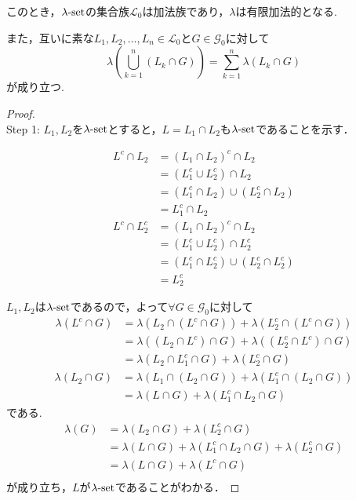 \documentclass{jsarticle}
\begin{document}
このとき，$\lambda{\rm \text{-}set}$の集合族$\mathcal{L}_0$は加法族であり，$\lambda$は有限加法的となる.

また，互いに素な$L_1,L_2,\dots,L_n\in\mathcal{L}_0$と$G\in\mathcal{G}_0$に対して
\begin{equation}
    \lambda\left( \bigcup_{k=1}^n (L_k\cap G) \right) = \sum_{k=1}^n \lambda(L_k\cap G) \nonumber 
\end{equation}
が成り立つ.

\begin{proof} \mbox{}\\
Step 1:
$L_1,L_2$を$\lambda{\rm \text{-}set}$とすると，$L=L_1\cap L_2$も$\lambda{\rm \text{-}set}$であることを示す．
\begin{itembox}{}
    \begin{align}
    L^c\cap L_2 &= (L_1\cap L_2)^c\cap L_2 \nonumber \\
    &=(L_1^c\cup L_2^c)\cap L_2 \nonumber \\
    &=(L_1^c \cap L_2) \cup (L_2^c \cap L_2) \nonumber \\
    &=L_1^c \cap L_2 \nonumber
    \end{align}
    \begin{align}
        L^c\cap L_2^c &= (L_1\cap L_2)^c\cap L_2 \nonumber \\
        &=(L_1^c\cup L_2^c)\cap L_2^c \nonumber \\
        &=(L_1^c \cap L_2^c) \cup (L_2^c \cap L_2^c) \nonumber \\
        &=L_2^c \nonumber
    \end{align}
\end{itembox}

$L_1,L_2$は$\lambda{\rm \text{-}set}$であるので，よって$\forall G\in\mathcal{G}_0$に対して
\begin{align}
    \lambda(L^c\cap G) &= \lambda(L_2\cap (L^c\cap G)) + \lambda(L_2^c\cap (L^c\cap G)) \nonumber \\
    &= \lambda((L_2\cap L^c)\cap G) + \lambda((L_2^c\cap L^c)\cap G) \nonumber \\
    &= \lambda(L_2\cap L_1^c\cap G) + \lambda(L_2^c\cap G) \nonumber
\end{align}
\begin{align}
    \lambda(L_2\cap G) &= \lambda(L_1\cap (L_2\cap G)) + \lambda(L_1^c\cap (L_2\cap G)) \nonumber \\
    &= \lambda(L\cap G) + \lambda(L_1^c\cap L_2\cap G) \nonumber
\end{align}
である.
\begin{align}
    \lambda(G) &= \lambda(L_2\cap G) + \lambda(L_2^c\cap G) \nonumber \\
    &= \lambda(L\cap G) + \lambda(L_1^c\cap L_2\cap G) + \lambda(L_2^c\cap G) \nonumber \\
    &= \lambda(L\cap G) + \lambda(L^c\cap G) \nonumber \\
\end{align}
が成り立ち，$L$が$\lambda{\rm \text{-}set}$であることがわかる．


\end{proof}
\end{document}
